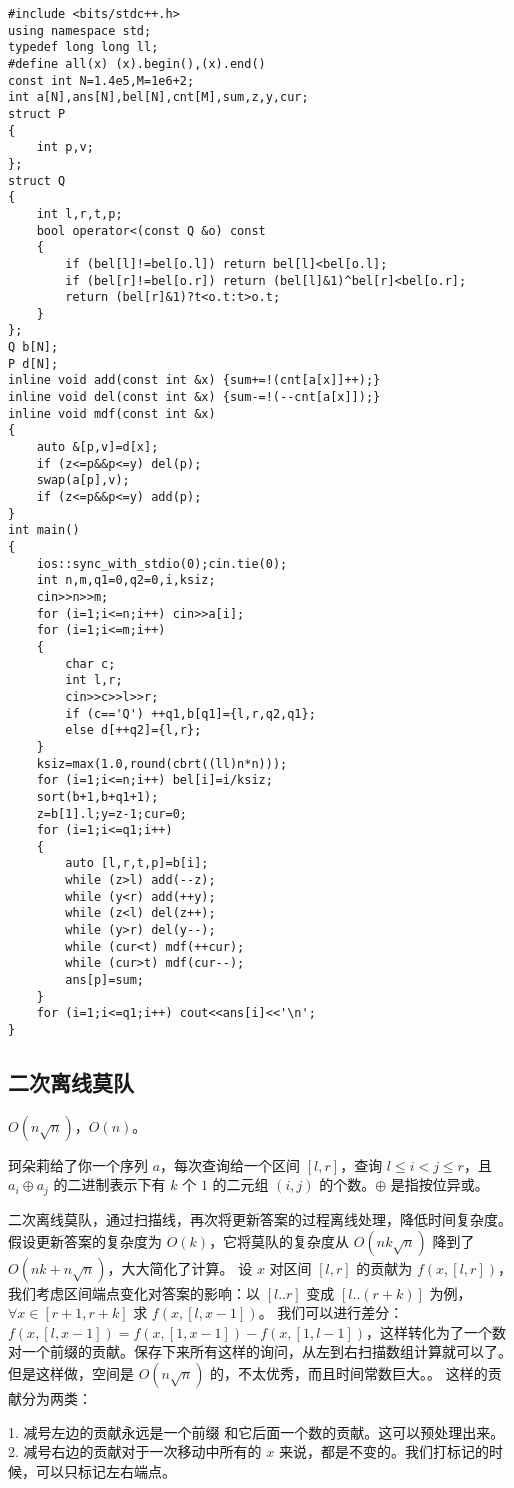 \documentclass[12pt]{ctexart}
\begin{document}
\begin{lstlisting}
#include <bits/stdc++.h>
using namespace std;
typedef long long ll;
#define all(x) (x).begin(),(x).end()
const int N=1.4e5,M=1e6+2;
int a[N],ans[N],bel[N],cnt[M],sum,z,y,cur;
struct P
{
	int p,v;
};
struct Q
{
	int l,r,t,p;
	bool operator<(const Q &o) const
	{
		if (bel[l]!=bel[o.l]) return bel[l]<bel[o.l];
		if (bel[r]!=bel[o.r]) return (bel[l]&1)^bel[r]<bel[o.r];
		return (bel[r]&1)?t<o.t:t>o.t;
	}
};
Q b[N];
P d[N];
inline void add(const int &x) {sum+=!(cnt[a[x]]++);}
inline void del(const int &x) {sum-=!(--cnt[a[x]]);}
inline void mdf(const int &x)
{
	auto &[p,v]=d[x];
	if (z<=p&&p<=y) del(p);
	swap(a[p],v);
	if (z<=p&&p<=y) add(p);
}
int main()
{
	ios::sync_with_stdio(0);cin.tie(0);
	int n,m,q1=0,q2=0,i,ksiz;
	cin>>n>>m;
	for (i=1;i<=n;i++) cin>>a[i];
	for (i=1;i<=m;i++)
	{
		char c;
		int l,r;
		cin>>c>>l>>r;
		if (c=='Q') ++q1,b[q1]={l,r,q2,q1};
		else d[++q2]={l,r};
	}
	ksiz=max(1.0,round(cbrt((ll)n*n)));
	for (i=1;i<=n;i++) bel[i]=i/ksiz;
	sort(b+1,b+q1+1);
	z=b[1].l;y=z-1;cur=0;
	for (i=1;i<=q1;i++)
	{
		auto [l,r,t,p]=b[i];
		while (z>l) add(--z);
		while (y<r) add(++y);
		while (z<l) del(z++);
		while (y>r) del(y--);
		while (cur<t) mdf(++cur);
		while (cur>t) mdf(cur--);
		ans[p]=sum;
	}
	for (i=1;i<=q1;i++) cout<<ans[i]<<'\n';
}

\end{lstlisting}

\subsection{二次离线莫队}

$O(n\sqrt n)$，$O(n)$。

珂朵莉给了你一个序列 $a$，每次查询给一个区间 $[l,r]$，查询 $l \leq i< j \leq r$，且 $a_i \oplus a_j$ 的二进制表示下有 $k$ 个 $1$ 的二元组 $(i,j)$ 的个数。$\oplus$ 是指按位异或。

二次离线莫队，通过扫描线，再次将更新答案的过程离线处理，降低时间复杂度。假设更新答案的复杂度为 $O(k)$，它将莫队的复杂度从 $O(nk\sqrt n)$ 降到了 $O(nk + n\sqrt n)$，大大简化了计算。
设 $x$ 对区间 $[l,r]$ 的贡献为 $f(x,[l,r])$，我们考虑区间端点变化对答案的影响：以 $[l..r]$ 变成 $[l..(r+k)]$ 为例，$\forall x \in [r+1,r+k]$ 求 $f(x,[l,x-1])$。
我们可以进行差分：$f(x,[l,x-1])=f(x,[1,x-1])-f(x,[1,l-1])$，这样转化为了一个数对一个前缀的贡献。保存下来所有这样的询问，从左到右扫描数组计算就可以了。  
但是这样做，空间是 $O(n\sqrt n)$ 的，不太优秀，而且时间常数巨大。。
这样的贡献分为两类：

1. 减号左边的贡献永远是一个前缀 和它后面一个数的贡献。这可以预处理出来。
2. 减号右边的贡献对于一次移动中所有的 $x$ 来说，都是不变的。我们打标记的时候，可以只标记左右端点。
\end{document}
